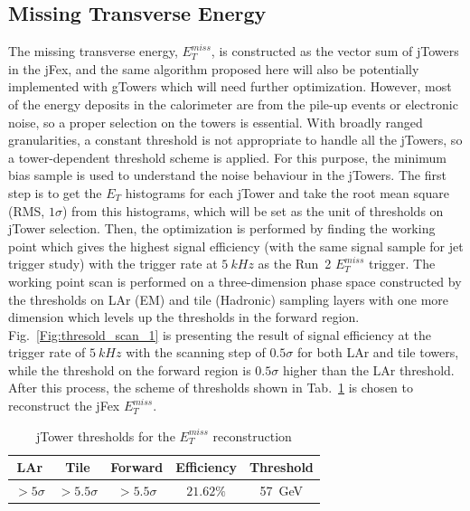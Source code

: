 \subsection{Missing Transverse Energy}
The missing transverse energy, $E^{miss}_{T}$, is constructed as the vector sum of jTowers in the jFex, and the same algorithm proposed here will also be potentially implemented with gTowers which will need further optimization. However, most of the energy deposits in the calorimeter are from the pile-up events or electronic noise, so a proper selection on the towers is essential. With broadly ranged granularities, a constant threshold is not appropriate to handle all the jTowers, so a tower-dependent threshold scheme is applied. For this purpose, the minimum bias sample is used to understand the noise behaviour in the jTowers. The first step is to get the $E_{T}$ histograms for each jTower and take the root mean square (RMS, $1\sigma$) from this histograms, which will be set as the unit of thresholds on jTower selection. Then, the optimization is performed by finding the working point which gives the highest signal efficiency (with the same signal sample for jet trigger study) with the trigger rate at $5~kHz$ as the Run~2 $E^{miss}_{T}$ trigger. The working point scan is performed on a three-dimension phase space constructed by the thresholds on LAr (EM) and tile (Hadronic) sampling layers with one more dimension which levels up the thresholds in the forward region. Fig.~\ref{Fig:thresold_scan_1} is presenting the result of signal efficiency at the trigger rate of $5~kHz$ with the scanning step of $0.5\sigma$ for both LAr and tile towers, while the threshold on the forward region is $0.5\sigma$ higher than the LAr threshold. After this process, the scheme of thresholds shown in Tab.~\ref{Tab:cuts_met} is chosen to reconstruct the jFex $E^{miss}_{T}$.
\begin{table}[h]
	\caption{jTower thresholds for the $E^{miss}_{T}$ reconstruction}
	\renewcommand{\arraystretch}{1.3}
	\centering
	\begin{tabular}{| c | c | c | c | c |  }
		\hline
		\hline
		LAr             &    Tile         &     Forward       & Efficiency & Threshold   \\
		\hline
		$>5\sigma$       &    $>5.5\sigma$  &     $>5.5\sigma$   &  $21.62\%$  &  57~GeV  \\
		\hline
	\end{tabular}
	\label{Tab:cuts_met}
\end{table}
